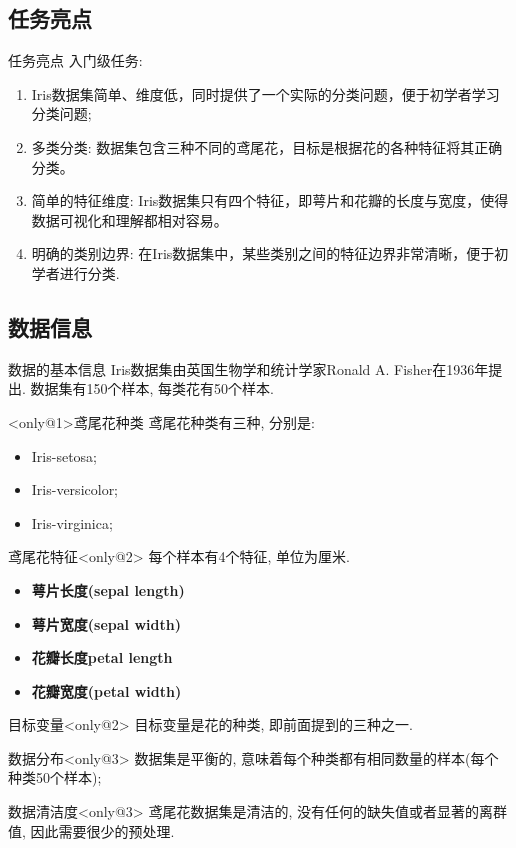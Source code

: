 \documentclass{beamer}
\begin{document}
\subsection{任务亮点}
\begin{frame}[fragile]{任务亮点}
	入门级任务:

	\begin{enumerate}
		\item Iris数据集简单、维度低，同时提供了一个实际的分类问题，便于初学者学习分类问题;
		\item 多类分类: 数据集包含三种不同的鸢尾花，目标是根据花的各种特征将其正确分类。
		\item 简单的特征维度: Iris数据集只有四个特征，即萼片和花瓣的长度与宽度，使得数据可视化和理解都相对容易。
		\item 明确的类别边界: 在Iris数据集中，某些类别之间的特征边界非常清晰，便于初学者进行分类.
	\end{enumerate}
\end{frame}

\subsection{数据信息}
\begin{frame}[fragile]{数据的基本信息}
	Iris数据集由英国生物学和统计学家Ronald A. Fisher在1936年提出. 数据集有150个样本, 每类花有50个样本.

	\begin{block}<only@1>{鸢尾花种类}
		鸢尾花种类有三种, 分别是:
		\begin{itemize}
			\item Iris-setosa;
			\item Iris-versicolor;
			\item Iris-virginica;
		\end{itemize}
	\end{block}
	\begin{block}{鸢尾花特征}<only@2>
		每个样本有4个特征, 单位为厘米.
		\begin{itemize}
			\item \textbf{萼片长度(sepal length)}
			\item \textbf{萼片宽度(sepal width)}
			\item \textbf{花瓣长度{petal length}}
			\item \textbf{花瓣宽度(petal width)}
		\end{itemize}
	\end{block}
	\begin{block}{目标变量}<only@2>
		目标变量是花的种类, 即前面提到的三种之一.
	\end{block}
	\begin{block}{数据分布}<only@3>
		数据集是平衡的, 意味着每个种类都有相同数量的样本(每个种类50个样本);
	\end{block}
	\begin{block}{数据清洁度}<only@3>
		鸢尾花数据集是清洁的, 没有任何的缺失值或者显著的离群值, 因此需要很少的预处理.
	\end{block}
\end{frame}
\end{document}
